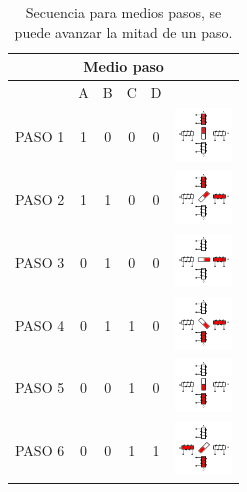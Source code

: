 \begin{table}
	\centering
	\caption{Secuencia para medios pasos, se puede avanzar la mitad de un paso. \cite{BasicStepper}}
	\label{tabla:medioPaso}
	\begin{tabular}{|c|c|c|c|c|p{2cm}|}
		\hline 
		\multicolumn{6}{|c|}{Medio paso} \\ 
		\hline 
		& \hspace{5mm} A \hspace{5mm} & \hspace{5mm} B \hspace{5mm} & \hspace{5mm} C \hspace{5mm} & \hspace{5mm} D \hspace{5mm} & \\ 
		\hline 
		PASO 1 & 1 & 0 & 0 & 0 & \includegraphics[width=15mm]{Imagenes/2/paso1}  \\ 
		\hline 
		PASO 2 & 1 & 1 & 0 & 0 & \includegraphics[width=15mm]{Imagenes/2/paso1_5} \\ 
		\hline 
		PASO 3 & 0 & 1 & 0 & 0 & \includegraphics[width=15mm]{Imagenes/2/paso2} \\ 
		\hline 
		PASO 4 & 0 & 1 & 1 & 0 & \includegraphics[width=15mm]{Imagenes/2/paso2_5} \\ 
		\hline 
		PASO 5 & 0 & 0 & 1 & 0 & \includegraphics[width=15mm]{Imagenes/2/paso3} \\ 
		\hline 
		PASO 6 & 0 & 0 & 1 & 1 & \includegraphics[width=15mm]{Imagenes/2/paso3_5} \\ 

\end{tabular}
\end{table}
